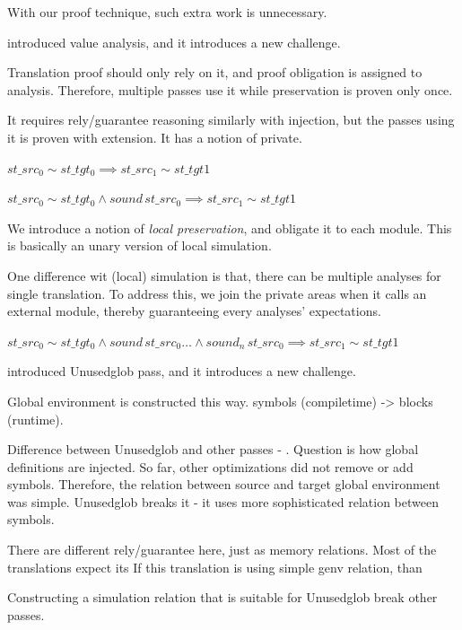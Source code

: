 {With our proof technique, such extra work is unnecessary.

\cc{} introduced value analysis, and it introduces a new challenge.

Translation proof should only rely on it, and proof obligation is assigned to analysis.
Therefore, multiple passes use it while preservation is proven only once.

It requires rely/guarantee reasoning similarly with injection, but the passes using it is proven with extension.
It has a notion of private.

$ st\_src_{0} \sim st\_tgt_{0} \implies st\_src_{1} \sim st\_tgt{1} $

$ st\_src_{0} \sim st\_tgt_{0} \wedge sound \, st\_src_{0} \implies st\_src_{1} \sim st\_tgt{1} $

We introduce a notion of \textit{local preservation}, and obligate it to each module.
This is basically an unary version of local simulation.

One difference wit (local) simulation is that, there can be multiple analyses for single translation.
To address this, we join the private areas when it calls an external module, thereby guaranteeing every analyses' expectations.

$ st\_src_{0} \sim st\_tgt_{0} \wedge sound \, st\_src_{0} \ldots \wedge sound_{n} \, st\_src_{0} \implies st\_src_{1} \sim st\_tgt{1} $


\cc{} introduced Unusedglob pass, and it introduces a new challenge.

Global environment is constructed this way. symbols (compiletime) -> blocks (runtime).

Difference between Unusedglob and other passes - .
Question is how global definitions are injected.
So far, other optimizations did not remove or add symbols.
Therefore, the relation between source and target global environment was simple. %
Unusedglob breaks it - it uses more sophisticated relation between symbols.

There are different rely/guarantee here, just as memory relations.
Most of the translations expect its If this translation is using simple genv relation, than


Constructing a simulation relation that is suitable for Unusedglob break other passes.




}
